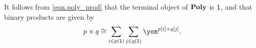 \documentclass[Book-Poly]{subfiles}
\begin{document}
It follows from \eqref{eqn.poly_prod} that the terminal object of $\mathbf{Poly}$ is $\textsf{1}$, and that binary products are given by
\begin{equation}\label{eqn.poly_times}
    p \times q \iso \sum_{i \in p(\1)} \sum_{j \in q(\1)} \yon^{p[i] + q[j]}.
\end{equation}

	
    
\end{document}

